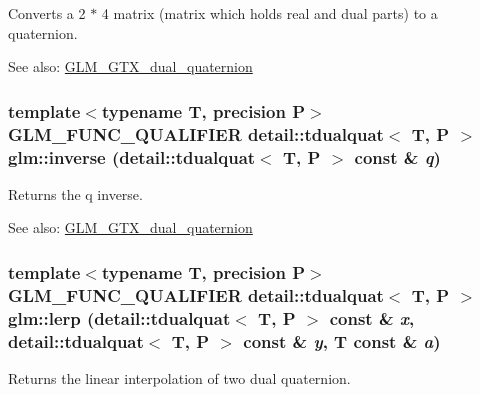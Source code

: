 Converts a 2 $\ast$ 4 matrix (matrix which holds real and dual parts) to a quaternion.

\begin{Desc}
\item[See also:]\hyperlink{group__gtc__dual__quaternion}{GLM\_\-GTX\_\-dual\_\-quaternion} \end{Desc}
\hypertarget{group__gtc__dual__quaternion_g793733e8cc7644ec2ff32a1007e85282}{
\subsubsection[inverse]{\setlength{\rightskip}{0pt plus 5cm}template$<$typename T, precision P$>$ GLM\_\-FUNC\_\-QUALIFIER detail::tdualquat$<$ T, P $>$ glm::inverse (detail::tdualquat$<$ T, P $>$ const \& {\em q})}}
\label{group__gtc__dual__quaternion_g793733e8cc7644ec2ff32a1007e85282}


Returns the q inverse.

\begin{Desc}
\item[See also:]\hyperlink{group__gtc__dual__quaternion}{GLM\_\-GTX\_\-dual\_\-quaternion} \end{Desc}
\hypertarget{group__gtc__dual__quaternion_gfbbdf3bd28dbfe656af3d86b9c7e0cd3}{
\subsubsection[lerp]{\setlength{\rightskip}{0pt plus 5cm}template$<$typename T, precision P$>$ GLM\_\-FUNC\_\-QUALIFIER detail::tdualquat$<$ T, P $>$ glm::lerp (detail::tdualquat$<$ T, P $>$ const \& {\em x}, \/  detail::tdualquat$<$ T, P $>$ const \& {\em y}, \/  T const \& {\em a})}}
\label{group__gtc__dual__quaternion_gfbbdf3bd28dbfe656af3d86b9c7e0cd3}


Returns the linear interpolation of two dual quaternion.

